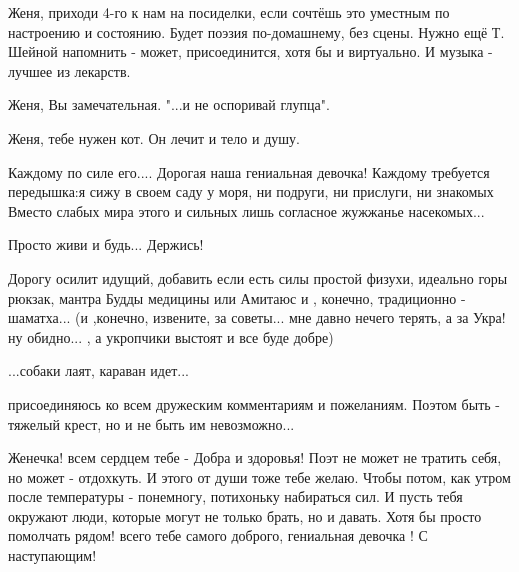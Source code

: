 \begin{itemize}

Женя, приходи 4-го к нам на посиделки, если сочтёшь это уместным по настроению
и состоянию. Будет поэзия по-домашнему, без сцены. Нужно ещё Т. Шейной напомнить
- может, присоединится, хотя бы и виртуально. И музыка - лучшее из лекарств. \Smiley[1.0][yellow]



Женя, Вы замечательная. "...и не оспоривай глупца".


Женя, тебе нужен кот. Он лечит и тело и душу.


Каждому по силе его.... Дорогая наша гениальная девочка! Каждому требуется
передышка:я сижу в своем саду у моря, ни подруги, ни прислуги, ни знакомых
Вместо слабых мира этого и сильных лишь согласное жужжанье насекомых...



Просто живи и будь... Держись!


Дорогу осилит идущий, добавить если есть силы простой физухи, идеально горы
рюкзак, мантра Будды медицины или Амитаюс и , конечно, традиционно - шаматха...
(и ,конечно, извените, за советы... мне давно нечего терять, а за Укра!ну
обидно... , а укропчики выстоят и все буде добре)

...собаки лаят, караван идет...

присоединяюсь ко всем дружеским комментариям и пожеланиям. Поэтом быть - тяжелый крест, но и не быть им невозможно...

Женечка! всем сердцем тебе - Добра и здоровья! Поэт не может не тратить себя, но может - отдохкуть. И этого от души тоже тебе желаю. Чтобы потом, как утром после температуры - понемногу, потихоньку набираться сил. И пусть тебя окружают люди, которые могут не только брать, но и давать. Хотя бы просто помолчать рядом! всего тебе самого доброго, гениальная девочка ! С наступающим!


\end{itemize}
